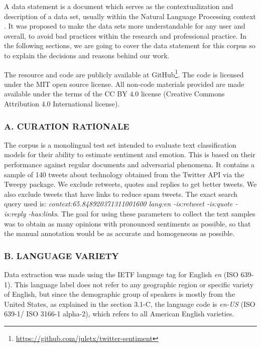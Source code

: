 \documentclass[11pt,a4paper]{article}
\begin{document}
A data statement is a document which serves as the contextualization and description of a data set, usually within the Natural Language Processing context \cite{bender-friedman-2018-data}. It was proposed to make the data sets more understandable for any user and overall, to avoid bad practices within the research and professional practice. In the following sections, we are going to cover the data statement for this corpus so to explain the decisions and reasons behind our work.

The resource and code are publicly available at GitHub\footnote{\url{https://github.com/juletx/twitter-sentiment}}. The code is licensed under the MIT open source license. All non-code materials provided are made available under the terms of the CC BY 4.0 license
(Creative Commons Attribution 4.0 International license).

\subsubsection*{A. CURATION RATIONALE}
The corpus is a monolingual test set intended to evaluate text classification models for their ability to estimate sentiment and emotion. This is based on their performance against regular documents and adversarial phenomena. It contains a sample of 140 tweets about technology obtained from the Twitter API via the Tweepy package. We exclude retweets, quotes and replies to get better tweets. We also exclude tweets that have links to reduce spam tweets. The exact search query used is:  \textit{context:65.848920371311001600 lang:en -is:retweet -is:quote -is:reply -has:links}. The goal for using these parameters to collect the text samples was to obtain as many opinions with pronounced sentiments as possible, so that the manual annotation would be as accurate and homogeneous as possible.

\subsubsection*{B. LANGUAGE VARIETY}
Data extraction was made using the IETF language tag for English \textit{en} (ISO 639-1). This language label does not refer to any geographic region or specific variety of English, but since the demographic group of speakers is mostly from the United States, as explained in the section 3.1-C, the language code is \textit{en-US} (ISO 639-1/ ISO 3166-1 alpha-2), which refers to all American English varieties.
\end{document}
